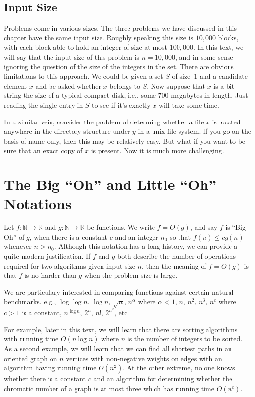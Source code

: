 \subsection{Input Size}

Problems come in various sizes.  The three problems we have discussed
in this chapter have the same input size.   Roughly speaking this
size is $10,000$ blocks, with each block able to hold an integer
of size at most $100,000$.  In this text, we will say that the
input size of this problem is $n=10,000$, and in some sense ignoring
the question of the size of the integers in the set.  There are 
obvious limitations to this approach.  We could be given a set $S$
of size~$1$ and a candidate element $x$ and be asked whether $x$ belongs
to $S$.  Now suppose that $x$ is a bit string the size of a typical
compact disk, i.e., some $700$ megabytes in length.  Just reading the single
entry in $S$ to see if it's exactly $x$ will take some time.

In a similar vein, consider the problem of determing whether a file
$x$ is located anywhere in the directory structure under $y$ in
a unix file system.  If you go on the basis of name only, then
this may be relatively easy.  But what if you want to be sure that an exact copy
of $x$ is present.  Now it is much more challenging.

\section{The Big ``Oh'' and Little ``Oh'' Notations}

Let $f:\mathbb{N}\longrightarrow \mathbb{R}$ and
$g:\mathbb{N}\longrightarrow\mathbb{R}$ be functions.
We write $f=O(g)$, and say $f$ is ``Big Oh'' of $g$,  
when there is a constant $c$ and an integer
$n_0$ so that $f(n)\le cg(n)$ whenever $n>n_0$.
Although this notation has a long history, we can provide
a quite modern justification.  If $f$ and $g$ both describe
the number of operations  required for two algorithms given input
size $n$, then the meaning of $f=O(g)$ is that $f$ is no
harder than $g$ when the problem size is large.

We are particulary interested in comparing functions against
certain natural benchmarks, e.g.,  $\log\log n$, $\log n$, $\sqrt{n}$, 
$n^\alpha$ where $\alpha<1$,  $n$, $n^2$, $n^3$, $n^c$ where $c>1$ 
is a constant, $n^{\log n}$, $2^n$, $n!$, $2^{n^2}$, etc.

For example, later in this text, we will learn that there
are sorting algorithms with running time $O(n\log n)$ where
$n$ is the number of integers to be sorted.  As a second 
example, we will learn that we can find all shortest paths in 
an oriented graph on $n$ vertices with non-negative weights on edges with an 
algorithm having running time $O(n^2)$.  At the other extreme,
no one knows whether there is a constant $c$ and an algorithm for 
determining whether the chromatic number of a graph is at most three
which has running time $O(n^c)$.  

